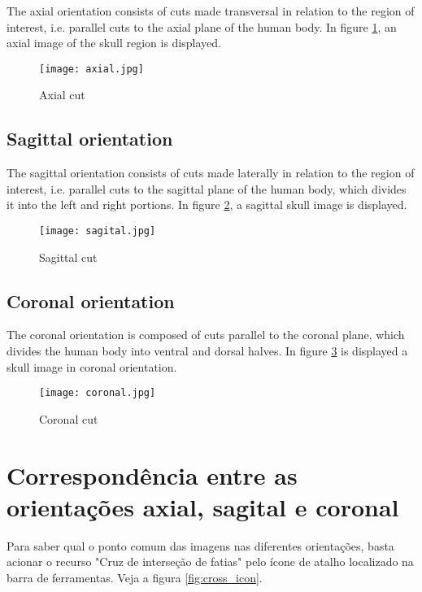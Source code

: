 The axial orientation consists of cuts made transversal in relation to the region of interest, i.e. parallel cuts to the axial plane of the human body.
In figure \ref{fig:axial_corte}, an axial image of the skull region is displayed.

\begin{figure}[!htb]
\centering
\texttt{[image: axial.jpg]}
\caption{Axial cut}
\label{fig:axial_corte}
\end{figure}

\subsection{Sagittal orientation}

The sagittal orientation consists of cuts made laterally in relation to the region of interest, i.e. parallel cuts to the sagittal plane of the human body, which divides it into the left and right portions.
In figure \ref{fig:sagital_slice}, a sagittal skull image is displayed.

\begin{figure}[!htb]
\centering
\texttt{[image: sagital.jpg]}
\caption{Sagittal cut}
\label{fig:sagital_slice}
\end{figure}

\newpage

\subsection{Coronal orientation}

The coronal orientation is composed of cuts parallel to the coronal plane, which divides the human body into ventral and dorsal halves.
In figure \ref{fig:coronal_slice} is displayed  a skull image in coronal orientation.

\begin{figure}[!htb]
\centering
\texttt{[image: coronal.jpg]}
\caption{Coronal cut}
\label{fig:coronal_slice}
\end{figure}


\section{Correspondência entre as orientações axial, sagital e coronal}
\label{sec:corresp_all_orient}

Para saber qual o ponto comum das imagens nas diferentes orientações, basta acionar o
recurso "Cruz de interseção de fatias" pelo ícone de atalho localizado na barra de ferramentas.
Veja a figura \ref{fig:cross_icon}.

